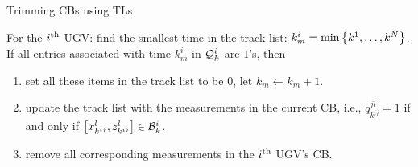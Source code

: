 	
	
	\begin{algorithm}
		\caption{Trimming CBs using TLs}
		\label{alg:tracklist}
		\begin{algorithmic}
			\State 
			For the $i^\text{th}$ UGV:			
			find the smallest time in the track list: $k^i_m=\min\left\lbrace k^{1},\dots,k^{N} \right\rbrace$. 			
			If all entries associated with time $k^i_m$ in $\mathcal{Q}^i_k$ are $1$'s, then 
			\begin{enumerate}
				\item set all these items in the track list to be $0$, let $k_m \leftarrow k_m+1.$
				\item update the track list with the measurements in the current CB, i.e., $q^{jl}_{k^{ij}}=1$ if and only if $\left[x^l_{k^{ij}},z^l_{k^{ij}}\right]\in \mathcal{B}^i_k$.
				\item remove all corresponding measurements in the $i^\text{th}$ UGV's CB.
			\end{enumerate}				
		\end{algorithmic}
	\end{algorithm}
	
